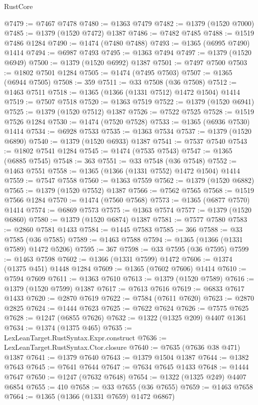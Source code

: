 \begin{lexlean}{RustCore}
\begin{coremodule}
@7479 := @7467 @7478
@7480 := @1363 @7479
@7482 := @1379 (@1520 @7000)
@7485 := @1379 (@1520 @7472) @1387
@7486 := @7482 @7485
@7488 := @1519 @7486 @1284
@7490 := @1474 (@7480 @7488)
@7493 := @1365 (@6995 @7490) @1414
@7494 := @6987 @7493
@7495 := @1363 @7494
@7497 := @1379 (@1520 @6949)
@7500 := @1379 (@1520 @6992) @1387
@7501 := @7497 @7500
@7503 := @1802 @7501 @1284
@7505 := @1474 (@7495 @7503)
@7507 := @1365 (@6944 @7505)
@7508 := 359
@7511 := @33 @7508 (@36 @7508)
@7512 := @1463 @7511
@7518 := @1365 (@1366 (@1331 @7512) @1472 @1504) @1414
@7519 := @7507 @7518
@7520 := @1363 @7519
@7522 := @1379 (@1520 @6941)
@7525 := @1379 (@1520 @7512) @1387
@7526 := @7522 @7525
@7528 := @1519 @7526 @1284
@7530 := @1474 (@7520 @7528)
@7533 := @1365 (@6936 @7530) @1414
@7534 := @6928 @7533
@7535 := @1363 @7534
@7537 := @1379 (@1520 @6890)
@7540 := @1379 (@1520 @6933) @1387
@7541 := @7537 @7540
@7543 := @1802 @7541 @1284
@7545 := @1474 (@7535 @7543)
@7547 := @1365 (@6885 @7545)
@7548 := 363
@7551 := @33 @7548 (@36 @7548)
@7552 := @1463 @7551
@7558 := @1365 (@1366 (@1331 @7552) @1472 @1504) @1414
@7559 := @7547 @7558
@7560 := @1363 @7559
@7562 := @1379 (@1520 @6882)
@7565 := @1379 (@1520 @7552) @1387
@7566 := @7562 @7565
@7568 := @1519 @7566 @1284
@7570 := @1474 (@7560 @7568)
@7573 := @1365 (@6877 @7570) @1414
@7574 := @6869 @7573
@7575 := @1363 @7574
@7577 := @1379 (@1520 @6860)
@7580 := @1379 (@1520 @6874) @1387
@7581 := @7577 @7580
@7583 := @2860 @7581 @1433
@7584 := @1445 @7583
@7585 := 366
@7588 := @33 @7585 (@36 @7585)
@7589 := @1463 @7588
@7594 := @1365 (@1366 (@1331 @7589) @1472 @5206)
@7595 := 367
@7598 := @33 @7595 (@36 @7595)
@7599 := @1463 @7598
@7602 := @1366 (@1331 @7599) @1472
@7606 := @1374 (@1375 @451) @1448 @1284
@7609 := @1365 (@7602 @7606) @1414
@7610 := @7594 @7609
@7611 := @1363 @7610
@7613 := @1379 (@1520 @7589)
@7616 := @1379 (@1520 @7599) @1387
@7617 := @7613 @7616
@7619 := @6833 @7617 @1433
@7620 := @2870 @7619
@7622 := @7584 (@7611 @7620)
@7623 := @2870 @2825
@7624 := @1444 @7623
@7625 := @7622 @7624
@7626 := @7575 @7625
@7628 := @1247 (@6855 @7626)
@7632 := @1322 (@1325 @209) @4407 @1361
@7634 := @1374 (@1375 @465)
@7635 := LexLeanTarget.RustSyntax.Expr.construct
@7636 := LexLeanTarget.RustSyntax.Ctor.closure
@7640 := @7635 (@7636 @38 @471) @1387
@7641 := @1379 @7640
@7643 := @1379 @1504 @1387
@7644 := @1382 @7643
@7645 := @7641 @7644
@7647 := @7634 @7645 @1433
@7648 := @1444 @7647
@7650 := @1247 (@7632 @7648)
@7654 := @1322 (@1325 @249) @4407 @6854
@7655 := 410
@7658 := @33 @7655 (@36 @7655)
@7659 := @1463 @7658
@7664 := @1365 (@1366 (@1331 @7659) @1472 @6867)

\end{coremodule}
\end{lexlean}
